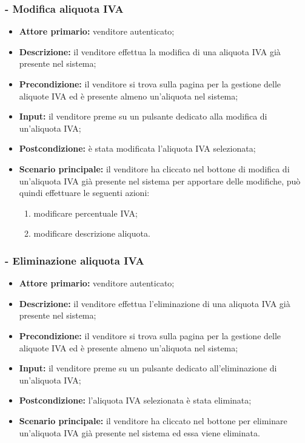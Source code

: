 \subsubsection{- Modifica aliquota IVA}
\begin{itemize}
    \item \textbf{Attore primario:} venditore autenticato;
    \item \textbf{Descrizione:} il venditore effettua la modifica di una aliquota IVA già presente nel sistema;
    \item \textbf{Precondizione:} il venditore si trova sulla pagina per la gestione delle aliquote IVA ed è presente almeno un'aliquota nel sistema;
    \item \textbf{Input:} il venditore preme su un pulsante dedicato alla modifica di un'aliquota IVA;
    \item \textbf{Postcondizione:} è stata modificata l'aliquota IVA selezionata;
    \item \textbf{Scenario principale:} il venditore ha cliccato nel bottone di modifica di un’aliquota IVA già presente nel sistema per apportare delle modifiche, può quindi effettuare le seguenti azioni:
          \begin{enumerate}
              \item modificare percentuale IVA;
              \item modificare descrizione aliquota.
          \end{enumerate}
\end{itemize}

\stepsubUserCase
\subsubsection{- Eliminazione aliquota IVA}
\begin{itemize}
    \item \textbf{Attore primario:} venditore autenticato;
    \item \textbf{Descrizione:} il venditore effettua l'eliminazione di una aliquota IVA già presente nel sistema;
    \item \textbf{Precondizione:} il venditore si trova sulla pagina per la gestione delle aliquote IVA ed è presente almeno un'aliquota nel sistema;
    \item \textbf{Input:} il venditore preme su un pulsante dedicato all'eliminazione di un'aliquota IVA;
    \item \textbf{Postcondizione:} l'aliquota IVA selezionata è stata eliminata;
    \item \textbf{Scenario principale:} il venditore ha cliccato nel bottone per eliminare un’aliquota IVA già presente nel sistema ed essa viene eliminata.
\end{itemize}

